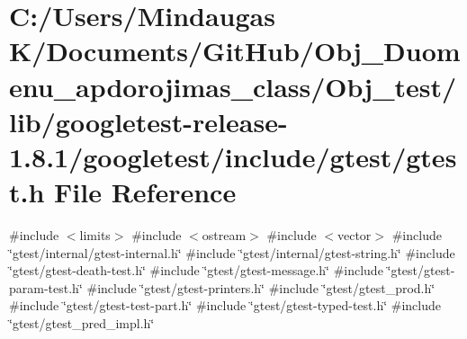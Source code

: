 \hypertarget{_obj__test_2lib_2googletest-release-1_88_81_2googletest_2include_2gtest_2gtest_8h}{}\section{C\+:/\+Users/\+Mindaugas K/\+Documents/\+Git\+Hub/\+Obj\+\_\+\+Duomenu\+\_\+apdorojimas\+\_\+class/\+Obj\+\_\+test/lib/googletest-\/release-\/1.8.1/googletest/include/gtest/gtest.h File Reference}
\label{_obj__test_2lib_2googletest-release-1_88_81_2googletest_2include_2gtest_2gtest_8h}
{\ttfamily \#include $<$limits$>$}\newline
{\ttfamily \#include $<$ostream$>$}\newline
{\ttfamily \#include $<$vector$>$}\newline
{\ttfamily \#include \char`\"{}gtest/internal/gtest-\/internal.\+h\char`\"{}}\newline
{\ttfamily \#include \char`\"{}gtest/internal/gtest-\/string.\+h\char`\"{}}\newline
{\ttfamily \#include \char`\"{}gtest/gtest-\/death-\/test.\+h\char`\"{}}\newline
{\ttfamily \#include \char`\"{}gtest/gtest-\/message.\+h\char`\"{}}\newline
{\ttfamily \#include \char`\"{}gtest/gtest-\/param-\/test.\+h\char`\"{}}\newline
{\ttfamily \#include \char`\"{}gtest/gtest-\/printers.\+h\char`\"{}}\newline
{\ttfamily \#include \char`\"{}gtest/gtest\+\_\+prod.\+h\char`\"{}}\newline
{\ttfamily \#include \char`\"{}gtest/gtest-\/test-\/part.\+h\char`\"{}}\newline
{\ttfamily \#include \char`\"{}gtest/gtest-\/typed-\/test.\+h\char`\"{}}\newline
{\ttfamily \#include \char`\"{}gtest/gtest\+\_\+pred\+\_\+impl.\+h\char`\"{}}\newline
